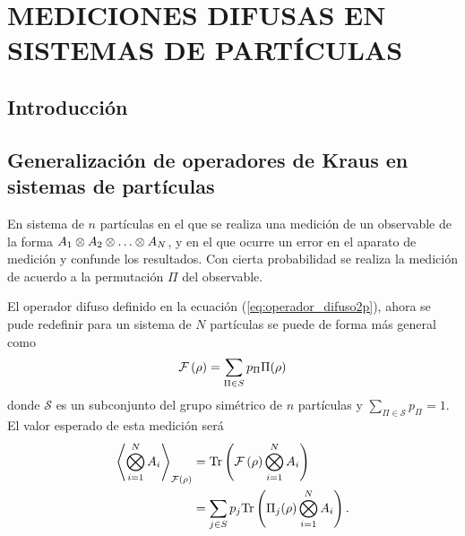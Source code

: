 \chapter{ MEDICIONES DIFUSAS EN SISTEMAS DE \texorpdfstring{}{N} PARTÍCULAS}
\section{ Introducción}

















\section{Generalización de operadores de Kraus en sistemas de \texorpdfstring{}{N} partículas}



En sistema de $n$ partículas en el que se realiza una medición de un observable de la forma $A_1\otimes A_2\otimes \hdots \otimes A_N$, y en el que ocurre un error en el aparato de medición y confunde los resultados. Con cierta probabilidad se realiza la medición de acuerdo a la permutación $\Pi$ del observable. 

El operador difuso definido en la ecuación ({\ref{eq:operador_difuso2p}}), ahora se pude redefinir para un sistema de $N$ partículas se puede de forma más general como\begin{equation}\label{eq:fm-nparticles}
   \mathcal{F}\left(\rho\right)=\sum_{\Pi\in S}p_{\Pi}\Pi(\rho)
\end{equation}donde $\mathcal{S}$ es un subconjunto del grupo simétrico de $n$ partículas y $\sum_{\Pi \in \mathcal{S}} p_\Pi=1$. El valor esperado de esta medición será {\cite{Pineda_2021}}\begin{equation}\label{eq:ExpectedValue-generalForm}\begin{split}
    \left \langle \bigotimes_{i=1}^{N} A_i\right \rangle_{\mathcal{F}(\rho)} &={\rm Tr}\left(\mathcal{F}\left(\rho\right)\bigotimes_{i=1}^{N} A_i\right)\\
    &=\sum_{j \in S}p_{j}{\rm Tr} \left(\Pi_j(\rho) \bigotimes_{i=1}^{N} A_i\right).
\end{split}
\end{equation} 

